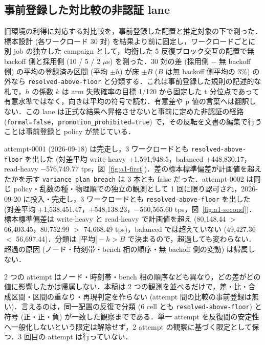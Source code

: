 \documentclass[submit,techrep,noauthor]{ipsj}
\begin{document}
\subsection{事前登録した対比較の非認証 lane}\label{sec:eval-a1}

旧環境の利得に対応する対比較を，事前登録した配置と推定対象の下で測った．標本設計 (各ワークロード 30 対) を結果より前に固定し，ワークロードごとに別 job の独立した campaign として，均衡した 5 反復ブロック交互の配置で無 backoff 側と採用側 (10 / 5 / 2 $\mu$s) を測った．30 対の差 (採用側 $-$ 無 backoff 側) の平均の登録済み区間 (平均 $\pm h$) が床 $\pm B$ ($B$ は無 backoff 側平均の 3\%) の外なら \texttt{resolved-above-floor} と分類する．これは事前登録した規則の記述的な札で，$h$ の係数 $k$ は arm 失敗確率の目標 1/120 から固定した t 分位点であって有意水準ではなく，向きは平均の符号で読む．有意差や p 値の言葉へは翻訳しない．この lane は正式な結果へ昇格させないと事前に定めた非認証の経路 (\texttt{formal=false}，\texttt{promotion\_prohibited=true}) で，その反転を文書の編集で行うことは事前登録と policy が禁じている．

attempt-0001 (2026-09-18) は完走し，3 ワークロードとも \texttt{resolved-above-floor} を出した (対差平均 write-heavy +1,591,948.5，balanced +448,830.17，read-heavy $-$576,749.77 tps，図~\ref{fig:a1-first})．差の標本標準偏差が計画値を超えたかを示す \texttt{variance\_plan\_breach} は 3 本とも false だった．attempt-0002 は同じ policy・乱数の種・物理順での独立の観測として 1 回に限り認可され，2026-09-20 に投入・完走し，3 ワークロードとも \texttt{resolved-above-floor} を出した (対差平均 +1,538,451.47，+548,138.23，$-$560,565.60 tps，図~\ref{fig:a1-second})．標本標準偏差は write-heavy と read-heavy で計画値を超え (80,148.44 $>$ 66,403.45，80,752.99 $>$ 74,668.49 tps)，balanced では超えていない (49,427.36 $<$ 56,697.44)．分類は $|\mbox{平均}| - h > B$ で決まるので，超過しても変わらない．超過の原因 (ノード・時刻帯・bench 相の順序・無 backoff 側の変動) は帰属しない．

2 つの attempt はノード・時刻帯・bench 相の順序なども異なり，どの差がどの値に影響したかは帰属しない．本稿は 2 つの観測を並べるだけで，差・比・合成区間・区間の重なり・再現判定を作らない (attempt 間の比較の事前登録は無い)．言えるのは，同一配置の反復で分類 (6 cell とも \texttt{resolved-above-floor}) と符号 (正・正・負) が一致した観察までである．単一 attempt を反復間の安定性へ一般化しないという限定は解除せず，2 attempt の観察に基づく限定として保つ．3 回目の attempt は行っていない．
\end{document}
